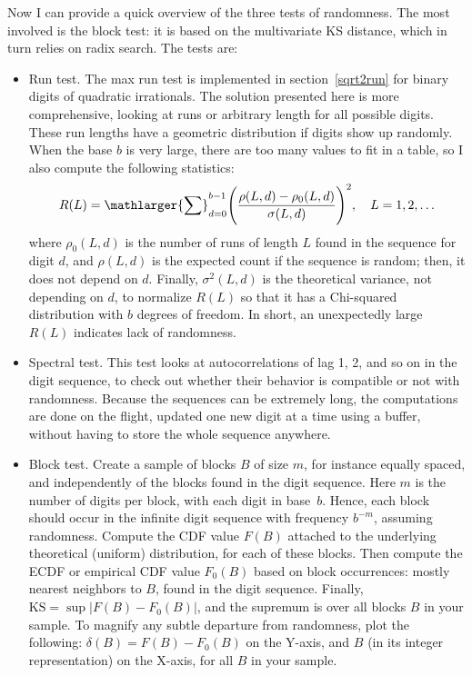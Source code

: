 \documentclass[oneside,10pt]{book}
\begin{document}
Now I can provide a quick overview of the three tests of randomness. The most involved is the block test: it is based on the 
multivariate KS distance, which in turn relies on radix search. The tests are:
\vspace{1ex}
\begin{itemize}
\item \textcolor{index}{Run test}.  The max run test is implemented in section~\ref{sqrt2run} for binary digits of quadratic irrationals. The solution presented here
 is more comprehensive, looking at runs or arbitrary length for all possible digits. These run lengths have a 
\textcolor{index}{geometric distribution} 
 if digits show up randomly. When the base $b$ is very large, there are too many values to fit in a table, so I also compute the following statistics:
\begin{equation}  
R(L) = \mathlarger{\sum}_{d=0}^{b-1}  \Bigg(\frac{\rho(L, d) - \rho_0(L, d)}{\sigma(L,d)}\Bigg)^2, \quad L = 1,2,\dots\label{pores}
\end{equation}
where $\rho_0(L, d)$ is the number of runs of length $L$ found in the sequence for digit $d$, and $\rho(L, d)$ is the expected count if the sequence is random; then, it does not depend on $d$. 
 Finally, $\sigma^2(L, d)$ is the theoretical variance, not depending on $d$, to normalize $R(L)$ so that it has a 
\textcolor{index}{Chi-squared distribution} with $b$ degrees of freedom. In short, an unexpectedly large $R(L)$ indicates lack of randomness. 
\vspace{1ex}

\item \textcolor{index}{Spectral test}. 
This test looks at autocorrelations of lag 1, 2, and so on in the digit sequence, to check out whether their behavior is
compatible or not with randomness.  Because the sequences can be extremely long, the computations are done on the flight, 
updated one new digit at a time using a buffer, without having to store the whole sequence anywhere.
\vspace{1ex}

\item \textcolor{index}{Block test}. Create a sample of blocks $B$ of size $m$, for instance equally spaced, and independently of the blocks found in the digit sequence. Here $m$ is the number of digits per block, with each digit in base~$b$. Hence, each block should occur in the infinite digit sequence with
 frequency $b^{-m}$, assuming randomness. 
Compute the CDF value $F(B)$ attached to the underlying theoretical (uniform) distribution, for each of these blocks.  
Then compute the ECDF or empirical CDF value $F_0(B)$ based on block occurrences: mostly nearest neighbors to $B$, found in the digit sequence. 
Finally, $\text{KS} = \sup |F(B) - F_0(B)|$, and the supremum is over all blocks $B$ in your sample. 
To magnify any subtle departure from randomness, plot the following: $\delta(B) = F(B) - F_0(B)$ on the Y-axis, and $B$ (in its integer representation) on the X-axis, for all $B$ in your sample.  
\end{itemize}
\vspace{1ex}
\end{document}

